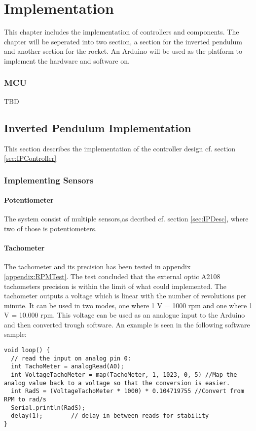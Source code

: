 \chapter{Implementation}
This chapter includes the implementation of controllers and components. The chapter will be seperated into two section, a section for the inverted pendulum and another section for the rocket. An Arduino will be used as the platform to implement the hardware and software on.    


\subsection{MCU}\label{sec:MCU}
TBD


\section{Inverted Pendulum Implementation}
This section describes the implementation of the controller design cf. section \ref{sec:IPController}

\subsection{Implementing Sensors}

\subsubsection*{Potentiometer}
The system consist of multiple sensors,as decribed cf. section \ref{sec:IPDesc}, where two of those is potentiometers. 


\subsubsection*{Tachometer}
The tachometer and its precision has been tested in appendix \ref{appendix:RPMTest}. The test concluded that the external optic A2108 tachometers precision is within the limit of what could implemented. The tachometer outputs a voltage which is linear with the number of revolutions per minute. It can be used in two modes, one where 1 V = 1000 rpm and one where 1 V = 10.000 rpm. This voltage can be used as an analogue input to the Arduino and then converted trough software. An example is seen in the following software sample: 

\begin{lstlisting}
void loop() {
  // read the input on analog pin 0:
  int TachoMeter = analogRead(A0);
  int VoltageTachoMeter = map(TachoMeter, 1, 1023, 0, 5) //Map the analog value back to a voltage so that the conversion is easier.
  int RadS = (VoltageTachoMeter * 1000) * 0.104719755 //Convert from RPM to rad/s
  Serial.println(RadS);
  delay(1);        // delay in between reads for stability
}
\end{lstlisting}  

